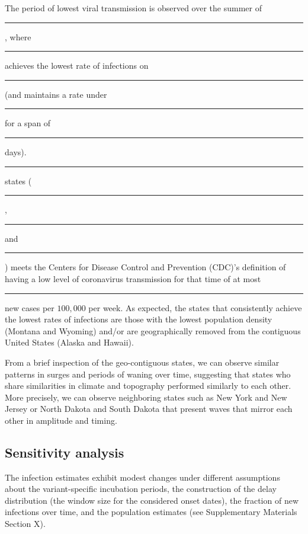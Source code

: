 \documentclass{article}
\newcommand{\attn }[1]{\textcolor{red}{ATTN: #1}}
\begin{document}
The period of lowest viral transmission is observed over the summer of \rule{1cm}{0.15mm},
where \rule{1cm}{0.15mm} achieves the lowest rate of infections on \rule{1cm}{0.15mm} (and
maintains a rate under \rule{1cm}{0.15mm} for a span of \rule{1cm}{0.15mm} days).
\rule{1cm}{0.15mm} states (\rule{1cm}{0.15mm}, \rule{1cm}{0.15mm} and \rule{1cm}{0.15mm})
meets the Centers for Disease Control and Prevention (CDC)’s definition of having a low
level of coronavirus transmission for that time of at most \rule{1cm}{0.15mm} new cases
per $100,000$ per week. As expected, the states that consistently achieve the lowest rates
of infections are those with the lowest population density (Montana and Wyoming) and/or
are geographically removed from the contiguous United States (Alaska and Hawaii). %

From a brief inspection of the geo-contiguous states, we can observe similar patterns in
surges and periods of waning over time, suggesting that states who share similarities in
climate and topography performed similarly to each other. More precisely, we can observe
neighboring states such as New York and New Jersey or North Dakota and South Dakota that
present waves that mirror each other in amplitude and timing.

\subsection{Sensitivity analysis}
The infection estimates exhibit modest changes under different assumptions about the
variant-specific incubation periods, the construction of the delay distribution (the
window size for the considered onset dates), the fraction of new infections over time, and
the population estimates (see Supplementary Materials Section X). 
\end{document}
